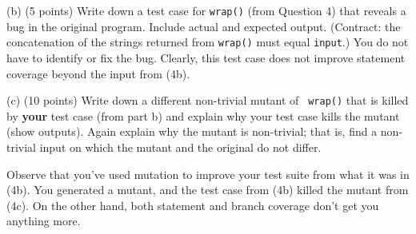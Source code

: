 \documentclass[12pt]{article}
\begin{document}
\vspace*{1em} \noindent
(b) (5 points) Write down a test case for {\tt wrap()} (from Question
4) that reveals a bug in the original program. Include actual and expected output.
(Contract: the concatenation of the strings
returned from {\tt wrap()} must equal {\tt input}.)
You do not have to identify or fix the bug.
  Clearly, this
test case does not improve statement coverage beyond the input from
(4b).

\vspace*{1em} \noindent
(c) (10 points) Write down a different non-trivial mutant of {\tt
  wrap()} that is killed by {\bf your} test case (from part b) and explain why your test
case kills the mutant (show outputs).  Again explain why the mutant is non-trivial;
that is, find a non-trivial input on which the mutant and the original
do not differ.

Observe that you've used mutation to improve your test suite from what
it was in (4b).  You generated a mutant, and the test case from (4b)
killed the mutant from (4c). On the other hand, both statement and branch
coverage don't get you anything more.




\end{document}

